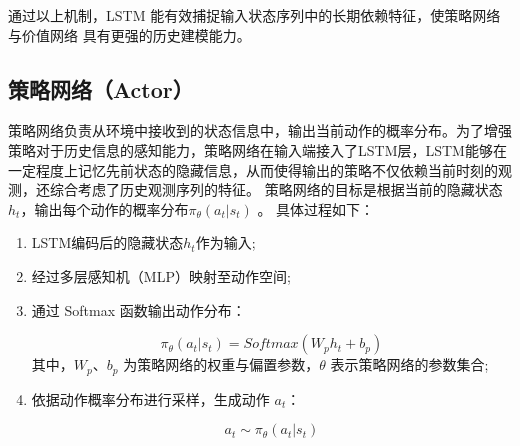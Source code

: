 通过以上机制，LSTM 能有效捕捉输入状态序列中的长期依赖特征，使策略网络与价值网络
具有更强的历史建模能力。

\subsection{策略网络（Actor）}

策略网络负责从环境中接收到的状态信息中，输出当前动作的概率分布。为了增强策略对于历史信息的感知能力，策略网络在输入端接入了LSTM层，LSTM能够在一定程度上记忆先前状态的隐藏信息，从而使得输出的策略不仅依赖当前时刻的观测，还综合考虑了历史观测序列的特征。
策略网络的目标是根据当前的隐藏状态$h_{t}$，输出每个动作的概率分布$\pi_{\theta}(a_{t}|s_{t})$ 。
具体过程如下：


\begin{enumerate} [label=\arabic*)] 

\item LSTM编码后的隐藏状态$h_{t}$作为输入;


\item 经过多层感知机（MLP）映射至动作空间;


\item 通过 Softmax 函数输出动作分布：

\begin{equation}
\pi_{\theta}(a_t | s_t) = Softmax(W_p h_t + b_p)
\tag{4.8}
\end{equation}
其中，$W_p$、$b_p$ 为策略网络的权重与偏置参数，$\theta$ 表示策略网络的参数集合;


\item 依据动作概率分布进行采样，生成动作 $a_t$：

\begin{equation}
a_t \sim \pi_\theta(a_t | s_t)
\end{equation}

\end{enumerate}

